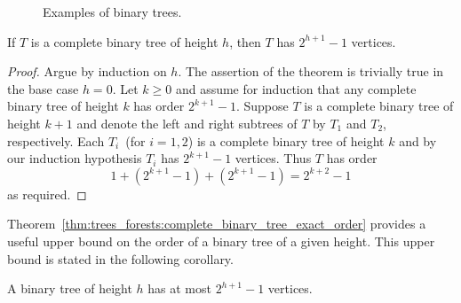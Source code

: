 \begin{figure}[!htbp]
\centering
{}

\caption{Examples of binary trees.}
\label{fig:trees_forests:examples_binary_trees}
\end{figure}

\begin{theorem}
\label{thm:trees_forests:complete_binary_tree_exact_order}
If $T$ is a complete binary tree of height
$h$, then $T$ has $2^{h+1} - 1$ vertices.
\end{theorem}

\begin{proof}
Argue by induction on $h$. The assertion of the
theorem is trivially true in the base case $h = 0$. Let $k \geq 0$ and
assume for induction that any complete binary tree of height $k$ has
order $2^{k+1} - 1$. Suppose $T$ is a
complete binary tree of height $k + 1$ and
denote the left and right
subtrees of $T$ by $T_1$ and $T_2$, respectively. Each $T_i$~(for
$i = 1,2$) is a complete binary tree of
height $k$ and by our induction hypothesis $T_i$ has $2^{k+1} - 1$
vertices. Thus $T$ has order
\[
1 + (2^{k+1} - 1) + (2^{k+1} - 1)
=
2^{k+2} - 1
\]
as required.
\end{proof}

Theorem~\ref{thm:trees_forests:complete_binary_tree_exact_order}
provides a useful upper bound on the order of a
binary tree of a given height. This upper bound is
stated in the following corollary.

\begin{corollary}
A binary tree of height $h$ has at most $2^{h+1} - 1$ vertices.
\end{corollary}

